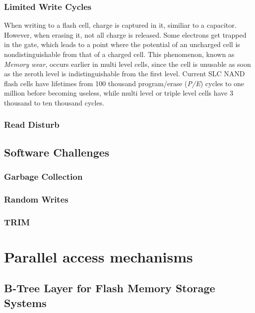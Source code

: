 \documentclass{acm_proc_article-sp}
\begin{document}
\subsubsection{Limited Write Cycles}
When writing to a flash cell, charge is captured in it, similiar to a capacitor. %
However, when erasing it, not all charge is released. Some electrons get trapped in the gate, which leads to a point where the potential of an uncharged cell is nondistinguishable from that of a charged cell. This phenomenon, known as \emph{Memory wear}, occurs earlier in multi level cells, since the cell is unusable as soon as the zeroth level is indistinguishable from the first level.
Current SLC NAND flash cells have lifetimes from 100 thousand program/erase (\emph{P/E}) cycles to one million before becoming useless, while multi level or triple level cells have 3 thousand to ten thousand cycles.

\subsubsection{Read Disturb}

\subsection{Software Challenges}

\subsubsection{Garbage Collection}

\subsubsection{Random Writes}

\subsubsection{TRIM}

\section{Parallel access mechanisms}

\subsection{B-Tree Layer for Flash Memory Storage Systems}
\end{document}
